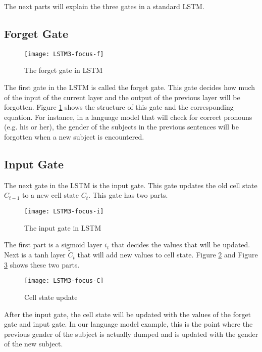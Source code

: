         The next parts will explain the three gates in a standard LSTM.

    \subsection{Forget Gate}
        \begin{figure}[H]
        \centering
        \texttt{[image: LSTM3-focus-f]}
        \caption{The forget gate in LSTM \citep{olah2015understanding}}
        \label{fig:lstm-forget-gate}
        \end{figure}
        The first gate in the LSTM is called the forget gate. This gate decides how much of the input of the current layer and the output of the previous layer will be forgotten. Figure \ref{fig:lstm-forget-gate} shows the structure of this gate and the corresponding equation. For instance, in a language model that will check for correct pronouns (e.g. his or her), the gender of the subjects in the previous sentences will be forgotten when a new subject is encountered.

    \subsection{Input Gate}
        The next gate in the LSTM is the input gate. This gate updates the old cell state \( C_{t-1} \) to a new cell state \( C_t \). This gate has two parts.

        \begin{figure}[H]
        \centering
        \texttt{[image: LSTM3-focus-i]}
        \caption{The input gate in LSTM \citep{olah2015understanding}}
        \label{fig:lstm-input-gate}
        \end{figure}
        The first part is a sigmoid layer \( i_t \) that decides the values that will be updated. Next is a tanh layer \(\tilde{C}_t\) that will add new values to cell state. Figure \ref{fig:lstm-input-gate} and  Figure \ref{fig:lstm-cell-state-update} shows these two parts.

        \begin{figure}[H]
        \centering
        \texttt{[image: LSTM3-focus-C]}
        \caption{Cell state update \citep{olah2015understanding}}
        \label{fig:lstm-cell-state-update}
        \end{figure}
        After the input gate, the cell state will be updated with the values of the forget gate and input gate. In our language model example, this is the point where the previous gender of the subject is actually dumped and is updated with the gender of the new subject.

